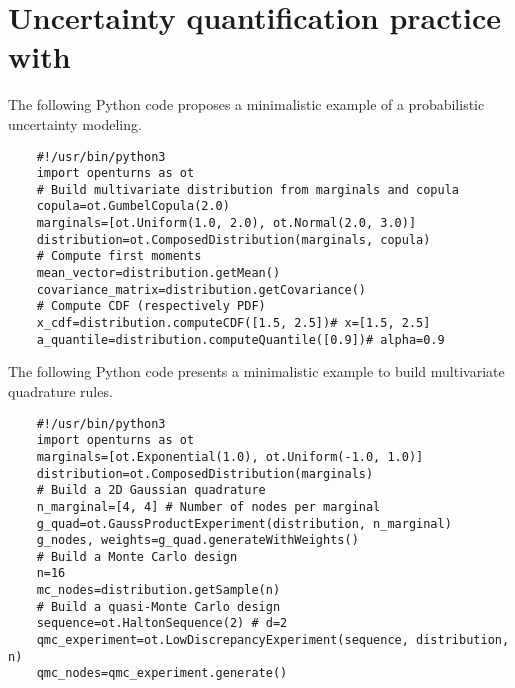 \cleardoublepage
\chapter{Uncertainty quantification practice with \ot}
\label{apx:D}




\begin{otexample}
    The following Python code proposes a minimalistic \ot example of a probabilistic uncertainty modeling. 
    \lstset{style=mystyle, language=python}
%
\begin{lstlisting}
    #!/usr/bin/python3
    import openturns as ot
    # Build multivariate distribution from marginals and copula
    copula=ot.GumbelCopula(2.0)
    marginals=[ot.Uniform(1.0, 2.0), ot.Normal(2.0, 3.0)]
    distribution=ot.ComposedDistribution(marginals, copula)
    # Compute first moments
    mean_vector=distribution.getMean()
    covariance_matrix=distribution.getCovariance()
    # Compute CDF (respectively PDF)
    x_cdf=distribution.computeCDF([1.5, 2.5])# x=[1.5, 2.5]
    a_quantile=distribution.computeQuantile([0.9])# alpha=0.9
\end{lstlisting}
%
\end{otexample}

\begin{otexample}
    The following Python code presents a minimalistic \ot example to build multivariate quadrature rules.
%
\lstset{style=mystyle, language=python}
\begin{lstlisting}
    #!/usr/bin/python3
    import openturns as ot
    marginals=[ot.Exponential(1.0), ot.Uniform(-1.0, 1.0)]
    distribution=ot.ComposedDistribution(marginals)
    # Build a 2D Gaussian quadrature
    n_marginal=[4, 4] # Number of nodes per marginal
    g_quad=ot.GaussProductExperiment(distribution, n_marginal)
    g_nodes, weights=g_quad.generateWithWeights()
    # Build a Monte Carlo design
    n=16 
    mc_nodes=distribution.getSample(n)
    # Build a quasi-Monte Carlo design
    sequence=ot.HaltonSequence(2) # d=2
    qmc_experiment=ot.LowDiscrepancyExperiment(sequence, distribution, n)
    qmc_nodes=qmc_experiment.generate()
\end{lstlisting}
%
\end{otexample}


